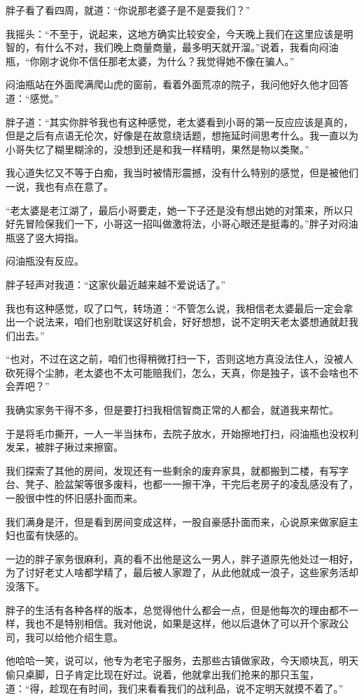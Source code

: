 胖子看了看四周，就道：“你说那老婆子是不是耍我们？”

我摇头：“不至于，说起来，这地方确实比较安全，今天晚上我们在这里应该是明智的，有什么不对，我们晚上商量商量，最多明天就开溜。”说着，我看向闷油瓶，“你刚才说你不信任那老太婆，为什么？我觉得她不像在骗人。”

闷油瓶站在外面爬满爬山虎的窗前，看着外面荒凉的院子，我问他好久他才回答道：“感觉。”

胖子道：“其实你胖爷我也有这种感觉，老太婆看到小哥的第一反应应该是真的，但是之后有点语无伦次，好像是在故意绕话题，想拖延时间思考什么。我一直以为小哥失忆了糊里糊涂的，没想到还是和我一样精明，果然是物以类聚。”

我心道失忆又不等于白痴，我当时被情形震撼，没有什么特别的感觉，但是被他们一说，我也有点在意了。

“老太婆是老江湖了，最后小哥要走，她一下子还是没有想出她的对策来，所以只好先冒险保我们一下，小哥这一招叫做激将法，小哥心眼还是挺毒的。”胖子对闷油瓶竖了竖大拇指。

闷油瓶没有反应。

胖子轻声对我道：“这家伙最近越来越不爱说话了。”

我也有这种感觉，叹了口气，转场道：“不管怎么说，我相信老太婆最后一定会拿出一个说法来，咱们也别耽误这好机会，好好想想，说不定明天老太婆想通就赶我们出去。”

“也对，不过在这之前，咱们也得稍微打扫一下，否则这地方真没法住人，没被人砍死得个尘肺，老太婆也不太可能赔我们，怎么，天真，你是独子，该不会啥也不会弄吧？”

我确实家务干得不多，但是要打扫我相信智商正常的人都会，就道我来帮忙。

于是将毛巾撕开，一人一半当抹布，去院子放水，开始擦地打扫，闷油瓶也没权利发呆，被胖子揪过来擦窗。

我们探索了其他的房间，发现还有一些剩余的废弃家具，就都搬到二楼，有写字台、凳子、脸盆架等很多废料，也都一一擦干净，干完后老房子的凌乱感没有了，一股很中性的怀旧感扑面而来。

我们满身是汗，但是看到房间变成这样，一股自豪感扑面而来，心说原来做家庭主妇也蛮有快感的。

一边的胖子家务很麻利，真的看不出他是这么一男人，胖子道原先他处过一相好，为了讨好老丈人啥都学精了，最后被人家蹬了，从此他就成一浪子，这些家务活却没落下。

胖子的生活有各种各样的版本，总觉得他什么都会一点，但是他每次的理由都不一样，我也不是特别相信。我对他说，如果是这样，他以后退休了可以开个家政公司，我可以给他介绍生意。

他哈哈一笑，说可以，他专为老宅子服务，去那些古镇做家政，今天顺块瓦，明天偷只桌脚，日子肯定比现在好过。说着，他就拿出我们抢来的那只玉玺，道：“得，趁现在有时间，我们来看看我们的战利品，说不定明天就摸不着了。”

